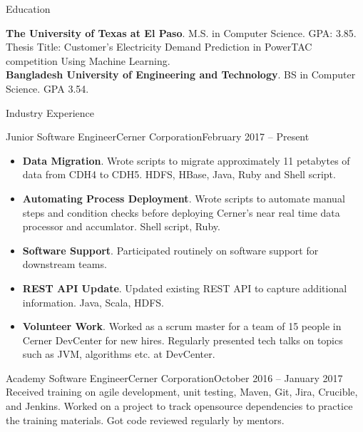 \documentclass[]{mcdowellcv}
\begin{document}
	\makeheader
	
	
	\begin{cvsection}{Education}
		\begin{cvsubsection}{}{}{}
				\textbf{The University of Texas at El Paso}. M.S. in Computer Science.  GPA: 3.85. \\
				Thesis Title: Customer's Electricity Demand Prediction in PowerTAC competition Using Machine Learning. \\
				\textbf{Bangladesh University of Engineering and Technology}. BS in Computer Science. GPA 3.54.  
		\end{cvsubsection}
	\end{cvsection}

	\begin{cvsection}{Industry Experience}
		\begin{cvsubsection}{Junior Software Engineer}{Cerner Corporation}{February 2017 -- Present}
			\begin{itemize}
				\item \textbf{Data Migration}. Wrote scripts to migrate approximately 11 petabytes of data from CDH4 to CDH5. HDFS, HBase, Java, Ruby and Shell script.		
				\item \textbf{Automating Process Deployment}. Wrote scripts to automate manual steps and condition checks before deploying Cerner's near real time data processor and accumlator. Shell script, Ruby.
				\item \textbf{Software Support}. Participated routinely on software support for downstream teams. 
				\item \textbf{REST API Update}. Updated existing REST API to capture additional information. Java, Scala, HDFS. 
				\item \textbf{Volunteer Work}. Worked as a scrum master for a team of 15 people in Cerner DevCenter for new hires. Regularly presented tech talks on topics such as JVM, algorithms etc. at DevCenter. 
			\end{itemize}
		\end{cvsubsection}		
		\begin{cvsubsection}{Academy Software Engineer}{Cerner Corporation}{October 2016 -- January 2017}	
			Received training on agile development, unit testing, Maven, Git, Jira, Crucible, and Jenkins. Worked on a project to track opensource dependencies to practice the training materials. Got code reviewed regularly by mentors. 
		\end{cvsubsection}
	\end{cvsection}
	
\end{document}
